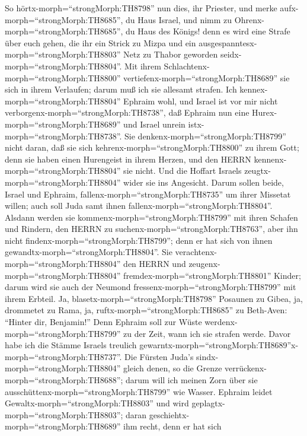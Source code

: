  So hörtx-morph=``strongMorph:TH8798'' nun dies, ihr
Priester, und merke aufx-morph=``strongMorph:TH8685'', du Haus Israel,
und nimm zu Ohrenx-morph=``strongMorph:TH8685'', du Haus des Königs!
denn es wird eine Strafe über euch gehen, die ihr ein Strick zu Mizpa
und ein ausgespanntesx-morph=``strongMorph:TH8803'' Netz zu Thabor
geworden seidx-morph=``strongMorph:TH8804''.  Mit ihrem
Schlachtenx-morph=``strongMorph:TH8800''
vertiefenx-morph=``strongMorph:TH8689'' sie sich in ihrem Verlaufen;
darum muß ich sie allesamt strafen.  Ich
kennex-morph=``strongMorph:TH8804'' Ephraim wohl, und Israel ist vor mir
nicht verborgenx-morph=``strongMorph:TH8738'', daß Ephraim nun eine
Hurex-morph=``strongMorph:TH8689'' und Israel unrein
istx-morph=``strongMorph:TH8738''.  Sie
denkenx-morph=``strongMorph:TH8799'' nicht daran, daß sie sich
kehrenx-morph=``strongMorph:TH8800'' zu ihrem Gott; denn sie haben einen
Hurengeist in ihrem Herzen, und den HERRN
kennenx-morph=``strongMorph:TH8804'' sie nicht.  Und die
Hoffart Israels zeugtx-morph=``strongMorph:TH8804'' wider sie ins
Angesicht. Darum sollen beide, Israel und Ephraim,
fallenx-morph=``strongMorph:TH8735'' um ihrer Missetat willen; auch soll
Juda samt ihnen fallenx-morph=``strongMorph:TH8804''. 
Alsdann werden sie kommenx-morph=``strongMorph:TH8799'' mit ihren
Schafen und Rindern, den HERRN zu suchenx-morph=``strongMorph:TH8763'',
aber ihn nicht findenx-morph=``strongMorph:TH8799''; denn er hat sich
von ihnen gewandtx-morph=``strongMorph:TH8804''.  Sie
verachtenx-morph=``strongMorph:TH8804'' den HERRN und
zeugenx-morph=``strongMorph:TH8804''
fremdex-morph=``strongMorph:TH8801'' Kinder; darum wird sie auch der
Neumond fressenx-morph=``strongMorph:TH8799'' mit ihrem Erbteil.
 Ja, blasetx-morph=``strongMorph:TH8798'' Posaunen zu Gibea,
ja, drommetet zu Rama, ja, ruftx-morph=``strongMorph:TH8685'' zu
Beth-Aven: ``Hinter dir, Benjamin!''  Denn Ephraim soll zur
Wüste werdenx-morph=``strongMorph:TH8799'' zu der Zeit, wann ich sie
strafen werde. Davor habe ich die Stämme Israels treulich
gewarntx-morph=``strongMorph:TH8689''x-morph=``strongMorph:TH8737''.
 Die Fürsten Juda's sindx-morph=``strongMorph:TH8804''
gleich denen, so die Grenze verrückenx-morph=``strongMorph:TH8688'';
darum will ich meinen Zorn über sie
ausschüttenx-morph=``strongMorph:TH8799'' wie Wasser. 
Ephraim leidet Gewaltx-morph=``strongMorph:TH8803'' und wird
geplagtx-morph=``strongMorph:TH8803''; daran
geschiehtx-morph=``strongMorph:TH8689'' ihm recht, denn er hat sich
